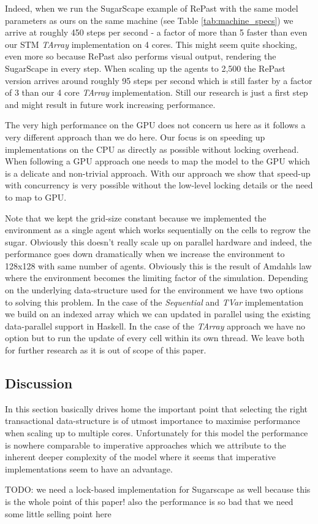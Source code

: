 Indeed, when we run the SugarScape example of RePast with the same model parameters as ours on the same machine (see Table \ref{tab:machine_specs}) we arrive at roughly 450 steps per second - a factor of more than 5 faster than even our STM \textit{TArray} implementation on 4 cores. This might seem quite shocking, even more so because RePast also performs visual output, rendering the SugarScape in every step. When scaling up the agents to 2,500 the RePast version arrives around roughly 95 steps per second which is still faster by a factor of 3 than our 4 core \textit{TArray} implementation. Still our research is just a first step and might result in future work increasing performance.

The very high performance on the GPU does not concern us here as it follows a very different approach than we do here. Our focus is on speeding up implementations on the CPU as directly as possible without locking overhead. When following a GPU approach one needs to map the model to the GPU which is a delicate and non-trivial approach. With our approach we show that speed-up with concurrency is very possible without the low-level locking details or the need to map to GPU.

Note that we kept the grid-size constant because we implemented the environment as a single agent which works sequentially on the cells to regrow the sugar. Obviously this doesn't really scale up on parallel hardware and indeed, the performance goes down dramatically when we increase the environment to 128x128 with same number of agents. Obviously this is the result of Amdahls law where the environment becomes the limiting factor of the simulation. Depending on the underlying data-structure used for the environment we have two options to solving this problem. In the case of the \textit{Sequential} and \textit{TVar} implementation we build on an indexed array which we can updated in parallel using the existing data-parallel support in Haskell. In the case of the \textit{TArray} approach we have no option but to run the update of every cell within its own thread. We leave both for further research as it is out of scope of this paper. 

\subsection{Discussion}
In this section basically drives home the important point that selecting the right transactional data-structure is of utmost importance to maximise performance when scaling up to multiple cores. Unfortunately for this model the performance is nowhere comparable to imperative approaches which we attribute to the inherent deeper complexity of the model where it seems that imperative implementations seem to have an advantage.

TODO: we need a lock-based implementation for Sugarscape as well because this is the whole point of this paper! also the performance is so bad that we need some little selling point here